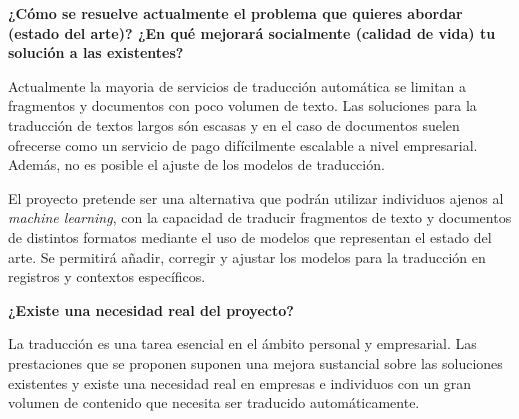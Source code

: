 \textbf{¿Cómo se resuelve actualmente el problema que quieres abordar (estado del arte)?
¿En qué mejorará socialmente (calidad de vida) tu solución a las existentes?}

Actualmente la mayoria de servicios de traducción automática se limitan a fragmentos y documentos
con poco volumen de texto. Las soluciones para la traducción de textos largos
són escasas y en el caso de documentos suelen ofrecerse
como un servicio de pago difícilmente escalable a nivel empresarial. Además, no es posible
el ajuste de los modelos de traducción.

El proyecto pretende ser una alternativa que podrán utilizar individuos ajenos al \textit{machine learning},
con la capacidad de traducir fragmentos de texto y documentos de distintos formatos mediante
el uso de modelos que representan el estado del arte.
Se permitirá añadir, corregir y ajustar los modelos para la traducción en registros y contextos
específicos.

\textbf{¿Existe una necesidad real del proyecto?}

La traducción es una tarea esencial en el ámbito personal y empresarial. Las prestaciones que se proponen
suponen una mejora sustancial sobre las soluciones existentes y existe una necesidad real en empresas
e individuos con un gran volumen de contenido que necesita ser traducido automáticamente.
 